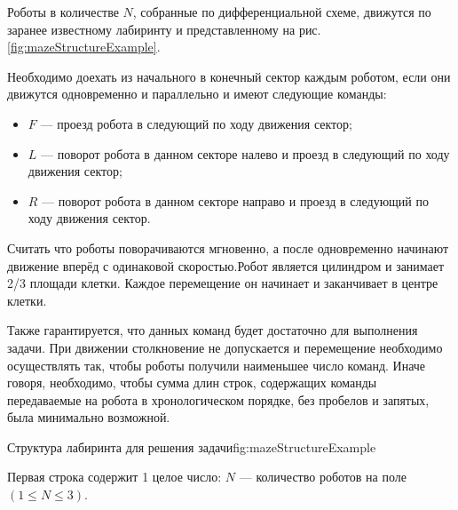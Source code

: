 
Роботы в количестве $N$, собранные по дифференциальной схеме, движутся по заранее известному лабиринту и
представленному на рис. \ref{fig:mazeStructureExample}.

Необходимо доехать из начального в конечный сектор каждым роботом, если они
движутся одновременно и параллельно и имеют следующие команды:
\begin{itemize}
    \item $F$ --- проезд робота в следующий по ходу движения сектор;
    \item $L$ --- поворот робота в данном секторе налево и проезд в следующий по ходу движения сектор;
    \item $R$ --- поворот робота в данном секторе направо и проезд в следующий по ходу движения сектор.
\end{itemize}
Считать что роботы поворачиваются мгновенно, а после одновременно начинают движение вперёд с 
одинаковой скоростью.Робот является цилиндром и занимает 2/3 площади клетки. Каждое перемещение он начинает и 
заканчивает в центре клетки.

Также гарантируется, что данных команд будет достаточно для выполнения задачи. При движении столкновение не 
допускается и перемещение необходимо осуществлять так, чтобы роботы получили наименьшее число команд. Иначе 
говоря, необходимо, чтобы сумма длин строк, содержащих команды передаваемые на робота в хронологическом порядке, 
без пробелов и запятых, была минимально возможной.



{Структура лабиринта для решения задачи}{fig:mazeStructureExample}





Первая строка содержит 1 целое число: $N$ --- количество роботов на поле $(1 \leq N \leq 3)$.

